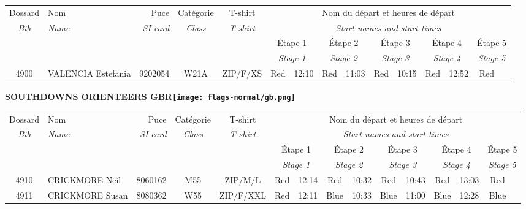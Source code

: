 \documentclass{report}
\begin{document}
  \begin{longtable}{|c|l|r|c|c|*{5}{cc|}}
    Dossard & Nom  & Puce    & Catégorie & T-shirt & \multicolumn{10}{c|}{Nom du départ et heures de départ} \\
    \itshape Bib     & \itshape Name & \itshape SI card & \itshape Class  & \itshape  T-shirt  & \multicolumn{10}{c|}{\itshape Start names and start times} \\
    \hline
    & & & & & \multicolumn{2}{c|}{Étape 1} & \multicolumn{2}{c|}{Étape 2} & \multicolumn{2}{c|}{Étape 3} & \multicolumn{2}{c|}{Étape 4} & \multicolumn{2}{c|}{Étape 5} \\
    & & & & & \multicolumn{2}{c|}{\itshape Stage 1} & \multicolumn{2}{c|}{\itshape Stage 2} & \multicolumn{2}{c|}{\itshape Stage 3} & \multicolumn{2}{c|}{\itshape Stage 4} & \multicolumn{2}{c|}{\itshape Stage 5} \\
    \hline
    4900 & VALENCIA Estefania & 9202054 & W21A & ZIP/F/XS & Red & 12:10 & Red & 11:03 & Red & 10:15 & Red & 12:52 & Red &  \\
  \end{longtable}
\newpage
  \Huge \centering \bfseries SOUTHDOWNS ORIENTEERS  GBR\normalfont \footnotesize \sffamily \hfill \texttt{[image: flags-normal/gb.png]} \newline 
  \begin{longtable}{|c|l|r|c|c|*{5}{cc|}}
    Dossard & Nom  & Puce    & Catégorie & T-shirt & \multicolumn{10}{c|}{Nom du départ et heures de départ} \\
    \itshape Bib     & \itshape Name & \itshape SI card & \itshape Class  & \itshape  T-shirt  & \multicolumn{10}{c|}{\itshape Start names and start times} \\
    \hline
    & & & & & \multicolumn{2}{c|}{Étape 1} & \multicolumn{2}{c|}{Étape 2} & \multicolumn{2}{c|}{Étape 3} & \multicolumn{2}{c|}{Étape 4} & \multicolumn{2}{c|}{Étape 5} \\
    & & & & & \multicolumn{2}{c|}{\itshape Stage 1} & \multicolumn{2}{c|}{\itshape Stage 2} & \multicolumn{2}{c|}{\itshape Stage 3} & \multicolumn{2}{c|}{\itshape Stage 4} & \multicolumn{2}{c|}{\itshape Stage 5} \\
    \hline
    4910 & CRICKMORE Neil & 8060162 & M55 & ZIP/M/L & Red & 12:14 & Red & 10:32 & Red & 10:43 & Red & 13:03 & Red &  \\
    4911 & CRICKMORE Susan & 8080362 & W55 & ZIP/F/XXL & Red & 12:11 & Blue & 10:33 & Blue & 11:00 & Blue & 12:28 & Blue &  \\
  \end{longtable}
\end{document}
